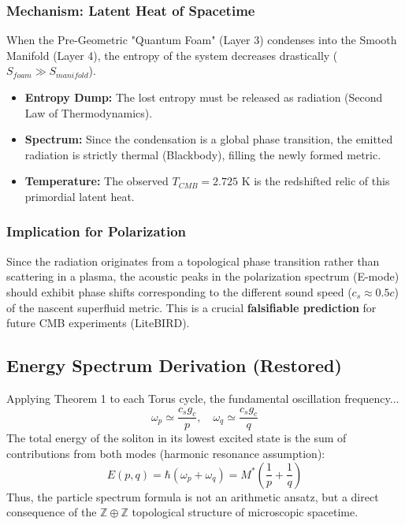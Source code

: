 \documentclass[a4paper,12pt]{article}
\begin{document}
\subsubsection{Mechanism: Latent Heat of Spacetime}
When the Pre-Geometric "Quantum Foam" (Layer 3) condenses into the Smooth Manifold (Layer 4), the entropy of the system decreases drastically ($S_{foam} \gg S_{manifold}$).
\begin{itemize}
    \item \textbf{Entropy Dump:} The lost entropy must be released as radiation (Second Law of Thermodynamics).
    \item \textbf{Spectrum:} Since the condensation is a global phase transition, the emitted radiation is strictly thermal (Blackbody), filling the newly formed metric.
    \item \textbf{Temperature:} The observed $T_{CMB} = 2.725$ K is the redshifted relic of this primordial latent heat.
\end{itemize}

\subsubsection{Implication for Polarization}
Since the radiation originates from a topological phase transition rather than scattering in a plasma, the acoustic peaks in the polarization spectrum (E-mode) should exhibit phase shifts corresponding to the different sound speed ($c_s \approx 0.5c$) of the nascent superfluid metric. This is a crucial \textbf{falsifiable prediction} for future CMB experiments (LiteBIRD).

\subsection{Energy Spectrum Derivation (Restored)}
Applying Theorem 1 to each Torus cycle, the fundamental oscillation frequency...
\begin{equation}
 \omega_p \simeq \frac{c_s g_c}{p}, \quad \omega_q \simeq \frac{c_s g_c}{q}
\end{equation}
The total energy of the soliton in its lowest excited state is the sum of contributions from both modes (harmonic resonance assumption):
\begin{equation}
 E(p,q) = \hbar (\omega_p + \omega_q) = M^* \left( \frac{1}{p} + \frac{1}{q} \right)
\end{equation}
Thus, the particle spectrum formula is not an arithmetic ansatz, but a direct consequence of the $\mathbb{Z} \oplus \mathbb{Z}$ topological structure of microscopic spacetime.
\end{document}
